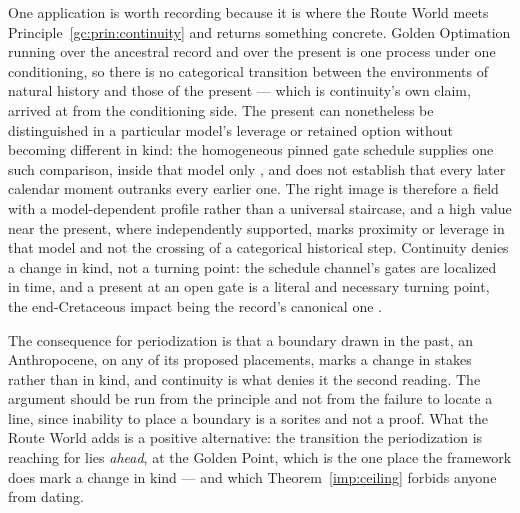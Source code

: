 \begin{remark}\label{gc:rem:periodization}
One application is worth recording because it is where the Route World
meets Principle~\ref{gc:prin:continuity} and returns something concrete. Golden Optimation running over the ancestral record and over the present
is one process under one conditioning, so there is no categorical
transition between the environments of natural history and those of the
present --- which is continuity's own claim, arrived at from the
conditioning side. The present can nonetheless be distinguished in a
particular model's leverage or retained option without becoming
different in kind: the homogeneous pinned gate schedule supplies one such
comparison, inside that model only \cite{GoldenTechnoanatomy}, and does
not establish that every later calendar moment outranks every earlier
one. The right image is therefore a field with a model-dependent profile
rather than a universal staircase, and a high value near the present,
where independently supported, marks proximity or leverage in that model
and not the crossing of a categorical historical step. Continuity
denies a change in kind, not a turning point: the schedule channel's
gates are localized in time, and a present at an open gate is a literal
and necessary turning point, the end-Cretaceous impact being the
record's canonical one \cite{GoldenTechnoanatomy}.

The consequence for periodization is that a boundary drawn in the past, an Anthropocene, on any of its proposed placements, marks a
change in stakes rather than in kind, and continuity is what denies it
the second reading. The argument should be run from the principle and
not from the failure to locate a line, since inability to place a
boundary is a sorites and not a proof. What the Route World adds is a
positive alternative: the transition the periodization is reaching for
lies \emph{ahead}, at the Golden Point, which is the one place the
framework does mark a change in kind --- and which
Theorem~\ref{imp:ceiling} forbids anyone from dating.


\end{remark}
